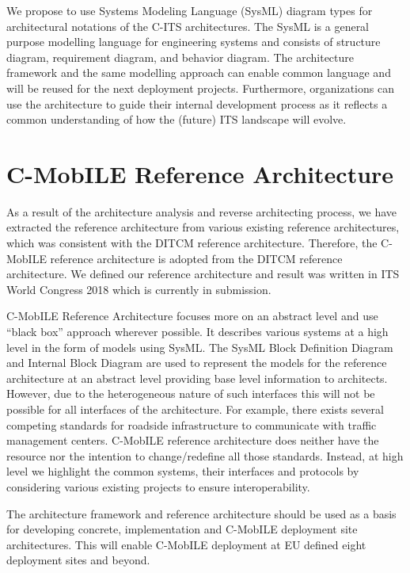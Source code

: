 \documentclass[conference]{IEEEtran}
\begin{document}
We propose to use Systems Modeling Language (SysML) diagram types for architectural notations of the C-ITS architectures. The SysML is a general purpose modelling language for engineering systems and consists of structure diagram, requirement diagram, and behavior diagram. The architecture framework and the same modelling approach can enable common language and will be reused for the next deployment projects. Furthermore, organizations can use the architecture to guide their internal development process as it reflects a common understanding of how the (future) ITS landscape will evolve.


\section{C-MobILE Reference Architecture}

As a result of the architecture analysis and reverse architecting process, we have extracted the reference architecture from various existing reference architectures, which was consistent with the DITCM reference architecture. Therefore, the C-MobILE reference architecture is adopted from the DITCM reference architecture. We defined our reference architecture and result was written in ITS World Congress 2018 which is currently in submission.

C-MobILE Reference Architecture focuses more on an abstract level and use “black box” approach wherever possible. It describes various systems at a high level in the form of models using SysML. The SysML Block Definition Diagram and Internal Block Diagram are used to represent the models for the reference architecture at an abstract level providing base level information to architects. However, due to the heterogeneous nature of such interfaces this will not be possible for all interfaces of the architecture. For example, there exists several competing standards for roadside infrastructure to communicate with traffic management centers. C-MobILE reference architecture does neither have the resource nor the intention to change/redefine all those standards. Instead, at high level we highlight the common systems, their interfaces and protocols by considering various existing projects to ensure interoperability. 

The architecture framework and reference architecture should be used as a basis for developing concrete, implementation and C-MobILE deployment site architectures. This will enable C-MobILE deployment at EU defined eight deployment sites and beyond. 
\end{document}
